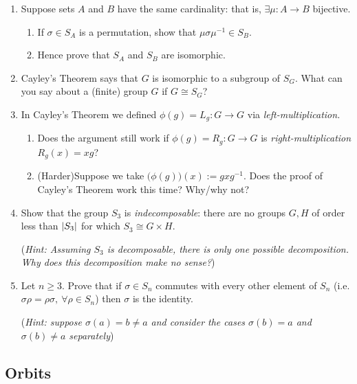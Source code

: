 \begin{exercises}
\begin{enumerate}
		
	  \item\label{exs:symmwd} Suppose sets $A$ and $B$ have the same cardinality: that is, $\exists \mu:A\to B$ bijective.
	  \begin{enumerate}
	    \item If $\sigma\in S_A$ is a permutation, show that $\mu\sigma\mu^{-1}\in S_B$.
	    \item Hence prove that $S_A$ and $S_B$ are isomorphic.
	  \end{enumerate}
	  
	  
	  \item Cayley's Theorem says that $G$ is isomorphic to a subgroup of $S_G$.  What can you say about a (finite) group $G$ if $G\cong S_G$?
	
	  
	  \item In Cayley's Theorem we defined $\phi(g)=L_g:G\to G$ via \emph{left-multiplication.}
	  \begin{enumerate}
	    \item Does the argument still work if $\phi(g)=R_g:G\to G$ is \emph{right-multiplication} $R_g(x)=xg$?
	    
	    \item (Harder)\lstsp Suppose we take $\bigl(\phi(g)\bigr)(x):=gx g^{-1}$. Does the proof of Cayley's Theorem work this time? Why/why not?
	  \end{enumerate}
		
		
		\item Show that the group $S_3$ is \emph{indecomposable}: there are no groups $G,H$ of order less than $\left| S_3\right|$ for which $S_3\cong G\times H$.\par
		(\emph{Hint: Assuming $S_3$ is decomposable, there is only one possible decomposition. Why does this decomposition make no sense?})
	  
	  
	  \item\label{exs:centerSn} Let $n\ge 3$. Prove that if $\sigma\in S_n$ commutes with every other element of $S_n$ (i.e. $\sigma\rho=\rho\sigma,\ \forall \rho\in S_n$) then $\sigma$ is the identity.\par
	  (\emph{Hint: suppose $\sigma(a)=b\neq a$ and consider the cases $\sigma(b)=a$ and $\sigma(b)\neq a$ separately})
	
	\end{enumerate}
\end{exercises}


\clearpage


\subsection{Orbits}\label{sec:orbits}


